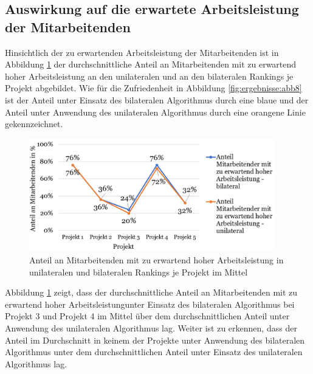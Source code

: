 
\subsection{Auswirkung auf die erwartete Arbeitsleistung der Mitarbeitenden}
Hinsichtlich der zu erwartenden Arbeitsleistung der Mitarbeitenden ist in Abbildung \ref{fig:ergebnisse:abb10} der durchschnittliche Anteil an Mitarbeitenden mit zu erwartend hoher Arbeitsleistung an den unilateralen und an den bilateralen Rankings je Projekt abgebildet.
Wie für die Zufriedenheit in Abbildung \ref{fig:ergebnisse:abb8} ist der Anteil unter Einsatz des bilateralen Algorithmus durch eine blaue und der Anteil unter Anwendung des unilateralen Algorithmus durch eine orangene Linie gekennzeichnet.

\begin{figure}[H]
    \centering
	\includegraphics[width=0.95\textwidth]{gfx/verhaeltnis-a-durchschnitt-projekte.png}
	\caption[Anteil an Mitarbeitenden mit zu erwartend hoher Arbeitsleistung in unilateralen und bilateralen Rankings je Projekt im Mittel]{Anteil an Mitarbeitenden mit zu erwartend hoher Arbeitsleistung in unilateralen und bilateralen Rankings je Projekt im Mittel}
	\label{fig:ergebnisse:abb10}
\end{figure}

Abbildung \ref{fig:ergebnisse:abb10} zeigt, dass der durchschnittliche Anteil an Mitarbeitenden mit zu erwartend hoher Arbeitsleistungunter Einsatz des bilateralen Algorithmus bei Projekt 3 und Projekt 4 im Mittel über dem durchschnittlichen Anteil unter Anwendung des unilateralen Algorithmus lag.
Weiter ist zu erkennen, dass der Anteil im Durchschnitt in keinem der Projekte unter Anwendung des bilateralen Algorithmus unter dem durchschnittlichen Anteil unter Einsatz des unilateralen Algorithmus lag.

